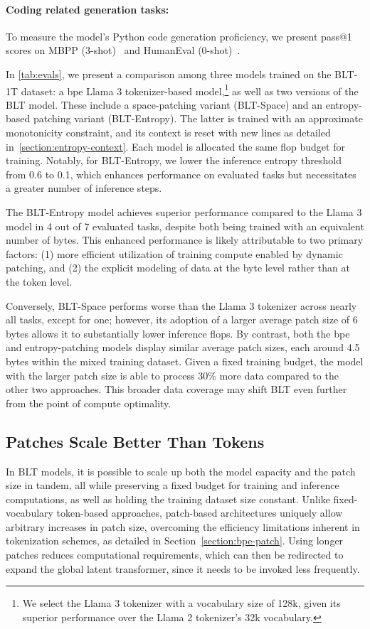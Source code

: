 \paragraph{Coding related generation tasks:} To measure the model's Python code generation proficiency, we present pass@1 scores on MBPP (3-shot)~\citep{Eval_MBPP} and HumanEval (0-shot)~\citep{Eval_HumanEval}.

In \autoref{tab:evals}, we present a comparison among three models trained on the {\textsc BLT}-1T dataset: a bpe Llama 3 tokenizer-based model,\footnote{We select the Llama 3 tokenizer with a vocabulary size of 128k, given its superior performance over the Llama 2 tokenizer's 32k vocabulary.} as well as two versions of the {\textsc BLT} model. These include a space-patching variant ({\textsc BLT}-Space) and an entropy-based patching variant ({\textsc BLT}-Entropy). The latter is trained with an approximate monotonicity constraint, and its context is reset with new lines as detailed in~\autoref{section:entropy-context}. Each model is allocated the same flop budget for training. Notably, for {\textsc BLT}-Entropy, we lower the inference entropy threshold from 0.6 to 0.1, which enhances performance on evaluated tasks but necessitates a greater number of inference steps.

The {\textsc BLT}-Entropy model achieves superior performance compared to the Llama 3 model in 4 out of 7 evaluated tasks, despite both being trained with an equivalent number of bytes. This enhanced performance is likely attributable to two primary factors: (1) more efficient utilization of training compute enabled by dynamic patching, and (2) the explicit modeling of data at the byte level rather than at the token level.

Conversely, {\textsc BLT}-Space performs worse than the Llama 3 tokenizer across nearly all tasks, except for one; however, its adoption of a larger average patch size of 6 bytes allows it to substantially lower inference flops. By contrast, both the bpe and entropy-patching models display similar average patch sizes, each around 4.5 bytes within the mixed training dataset. Given a fixed training budget, the model with the larger patch size is able to process 30\% more data compared to the other two approaches. This broader data coverage may shift {\textsc BLT} even further from the point of compute optimality.

\subsection{Patches Scale Better Than Tokens} In {\textsc BLT} models, it is possible to scale up both the model capacity and the patch size in tandem, all while preserving a fixed budget for training and inference computations, as well as holding the training dataset size constant. Unlike fixed-vocabulary token-based approaches, patch-based architectures uniquely allow arbitrary increases in patch size, overcoming the efficiency limitations inherent in tokenization schemes, as detailed in Section~\ref{section:bpe-patch}. Using longer patches reduces computational requirements, which can then be redirected to expand the global latent transformer, since it needs to be invoked less frequently.

